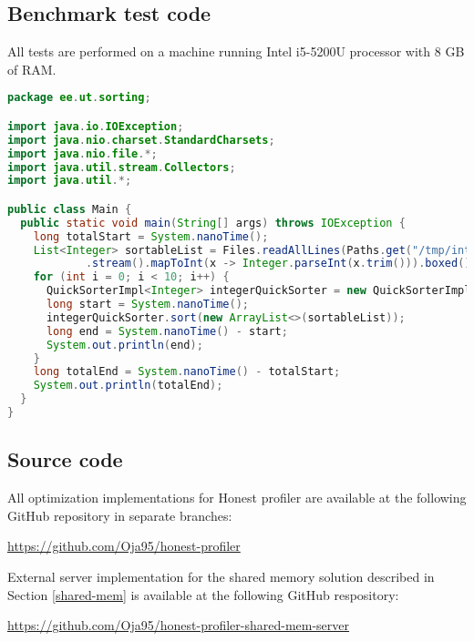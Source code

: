 \documentclass[..thesis.tex]{subfiles}
\begin{document}
\subsection{Benchmark test code}
\label{B:benchmark-test-code}
All tests are performed on a machine running Intel i5-5200U processor with 8 GB of RAM.

\begin{lstlisting}[language=Java,style=def]
package ee.ut.sorting;

import java.io.IOException;
import java.nio.charset.StandardCharsets;
import java.nio.file.*;
import java.util.stream.Collectors;
import java.util.*;

public class Main {
  public static void main(String[] args) throws IOException {
    long totalStart = System.nanoTime();
    List<Integer> sortableList = Files.readAllLines(Paths.get("/tmp/integers.data"), StandardCharsets.UTF_8)
            .stream().mapToInt(x -> Integer.parseInt(x.trim())).boxed().collect(Collectors.toList());
    for (int i = 0; i < 10; i++) {
      QuickSorterImpl<Integer> integerQuickSorter = new QuickSorterImpl<>();
      long start = System.nanoTime();
      integerQuickSorter.sort(new ArrayList<>(sortableList));
      long end = System.nanoTime() - start;
      System.out.println(end);
    }
    long totalEnd = System.nanoTime() - totalStart;
    System.out.println(totalEnd);
  }
}

\end{lstlisting}

\subsection{Source code}
\label{B:source-code}
All optimization implementations for Honest profiler are available at the following GitHub repository in separate branches:

\url{https://github.com/Oja95/honest-profiler}

External server implementation for the shared memory solution described in Section \ref{shared-mem} is available at the following GitHub respository:

\url{https://github.com/Oja95/honest-profiler-shared-mem-server}



\newpage
\end{document}
